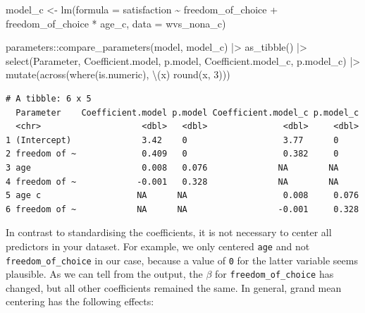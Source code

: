 \documentclass[
  letterpaper,
]{krantz}
\makeatletter
\newenvironment{Shaded}{\begin{snugshade}}{\end{snugshade}}
\newcommand{\AttributeTok}[1]{\textcolor[rgb]{0.40,0.45,0.13}{#1}}
\newcommand{\DecValTok}[1]{\textcolor[rgb]{0.68,0.00,0.00}{#1}}
\newcommand{\FunctionTok}[1]{\textcolor[rgb]{0.28,0.35,0.67}{#1}}
\newcommand{\NormalTok}[1]{\textcolor[rgb]{0.00,0.23,0.31}{#1}}
\newcommand{\OtherTok}[1]{\textcolor[rgb]{0.00,0.23,0.31}{#1}}
\newcommand{\SpecialCharTok}[1]{\textcolor[rgb]{0.37,0.37,0.37}{#1}}
\newenvironment{kframe}{%
\medskip{}
\setlength{\fboxsep}{.8em}
 \def\at@end@of@kframe{}%
 \ifinner\ifhmode%
  \def\at@end@of@kframe{\end{minipage}}%
  \begin{minipage}{\columnwidth}%
 \fi\fi%
 \def\FrameCommand##1{\hskip\@totalleftmargin \hskip-\fboxsep
 \colorbox{shadecolor}{##1}\hskip-\fboxsep
     \hskip-\linewidth \hskip-\@totalleftmargin \hskip\columnwidth}%
 \MakeFramed {\advance\hsize-\width
   \@totalleftmargin\z@ \linewidth\hsize
   \@setminipage}}%
 {\par\unskip\endMakeFramed%
 \at@end@of@kframe}
\renewenvironment{Shaded}{\begin{kframe}}{\end{kframe}}
\makeatother
\begin{document}
\begin{Shaded}
\begin{Highlighting}[]
\NormalTok{model\_c }\OtherTok{\textless{}{-}} \FunctionTok{lm}\NormalTok{(}\AttributeTok{formula =}\NormalTok{ satisfaction }\SpecialCharTok{\textasciitilde{}}
\NormalTok{                freedom\_of\_choice }\SpecialCharTok{+}
\NormalTok{                freedom\_of\_choice }\SpecialCharTok{*}\NormalTok{ age\_c,}
              \AttributeTok{data =}\NormalTok{ wvs\_nona\_c)}

\NormalTok{parameters}\SpecialCharTok{::}\FunctionTok{compare\_parameters}\NormalTok{(model, model\_c) }\SpecialCharTok{|\textgreater{}}
  \FunctionTok{as\_tibble}\NormalTok{() }\SpecialCharTok{|\textgreater{}}
  \FunctionTok{select}\NormalTok{(Parameter, Coefficient.model, p.model,}
\NormalTok{         Coefficient.model\_c, p.model\_c) }\SpecialCharTok{|\textgreater{}}
  \FunctionTok{mutate}\NormalTok{(}\FunctionTok{across}\NormalTok{(}\FunctionTok{where}\NormalTok{(is.numeric), \textbackslash{}(x) }\FunctionTok{round}\NormalTok{(x, }\DecValTok{3}\NormalTok{)))}
\end{Highlighting}
\end{Shaded}

\begin{verbatim}
# A tibble: 6 x 5
  Parameter    Coefficient.model p.model Coefficient.model_c p.model_c
  <chr>                    <dbl>   <dbl>               <dbl>     <dbl>
1 (Intercept)              3.42    0                   3.77      0    
2 freedom of ~             0.409   0                   0.382     0    
3 age                      0.008   0.076              NA        NA    
4 freedom of ~            -0.001   0.328              NA        NA    
5 age c                   NA      NA                   0.008     0.076
6 freedom of ~            NA      NA                  -0.001     0.328
\end{verbatim}

In contrast to standardising the coefficients, it is not necessary to
center all predictors in your dataset. For example, we only centered
\texttt{age} and not \texttt{freedom\_of\_choice} in our case, because a
value of \texttt{0} for the latter variable seems plausible. As we can
tell from the output, the \(\beta\) for \texttt{freedom\_of\_choice} has
changed, but all other coefficients remained the same. In general, grand
mean centering has the following effects:
\end{document}
